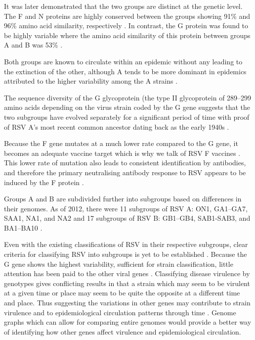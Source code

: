 \documentclass[10pt, a4paper]{article}
\begin{document}
It was later demonstrated that the two groups are distinct at the genetic level.
The F and N proteins are highly conserved between the groups showing 91\% and 96\%
amino acid similarity, respectively
\cite{caneMolecularEpidemiologyRespiratory2001}.
In contrast, the G protein was found to be highly variable where the amino acid
similarity of this protein between groups A and B was 53\%
\cite{zlatevaMolecularEvolutionCirculation2004}.

Both groups are known to circulate within an epidemic
\cite{aamirMolecularCharacterizationCirculating2013}
without any leading to the extinction of the other, although A tends to be more
dominant in epidemics attributed to the higher variability among the A strains
\cite{zlatevaMolecularEvolutionCirculation2004,aamirMolecularCharacterizationCirculating2013}.

The sequence diversity of the G glycoprotein
(the type II glycoprotein of 289–299 amino acids depending on the virus strain
\cite{caneMolecularEpidemiologyRespiratory2001}
coded by the G gene suggests that the two subgroups have evolved
separately for a significant period of time with proof of RSV A’s most recent
common ancestor dating back as the early 1940s
\cite{zlatevaMolecularEvolutionCirculation2004}.

Because the F gene mutates at a much lower rate compared to the G gene, it
becomes an adequate vaccine target which is why we talk of RSV F vaccines
\cite{andersonStrategicPrioritiesRespiratory2013a,giersingReportWorldHealth2016}.
This lower rate of mutation also leads to consistent identification by
antibodies, and therefore the primary neutralising antibody response to RSV
appears to be induced by the F protein \cite{higginsAdvancesRSVVaccine2016}.

Groups A and B are subdivided further into subgroups based on differences in
their genomes.
As of 2012, there were 11 subgroups of RSV A: ON1, GA1–GA7, SAA1, NA1, and NA2
and 17 subgroups of RSV B: GB1–GB4, SAB1-SAB3, and BA1–BA10
\cite{aamirMolecularCharacterizationCirculating2013,eshaghiGeneticVariabilityHuman2012,peretCirculationPatternsGroup2000,trentoMajorChangesProtein2003,venterGeneticDiversityMolecular2001}.

Even with the existing classifications of RSV in their respective subgroups,
clear criteria for classifying RSV into subgroups is yet to be established
\cite{munoz-escalanteRespiratorySyncytialVirus2019}.
Because the G gene shows the highest variability, sufficient for strain
classification, little attention has been paid to the other viral genes
\cite{munoz-escalanteRespiratorySyncytialVirus2019}.
Classifying disease virulence by genotypes gives conflicting results in that a
strain which may seem to be virulent at a given time or place may seem to be
quite the opposite at a different time and place.
Thus suggesting the variations in other genes may contribute to strain virulence
and to epidemiological circulation patterns through time
\cite{andersonRSVStrainsDisease2019}.
Genome graphs which can allow for comparing entire genomes would provide a
better way of identifying how other genes affect virulence and epidemiological
circulation.
\end{document}
